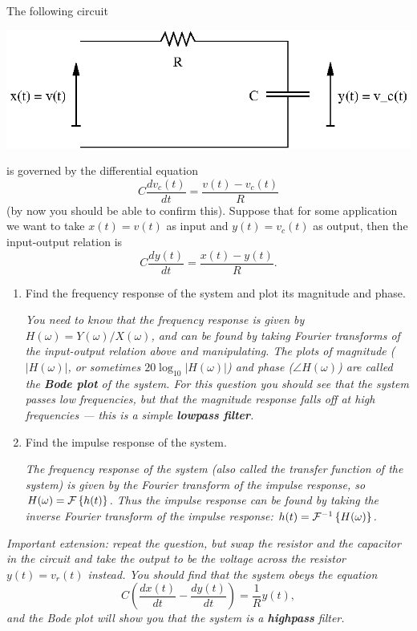 The following circuit
\begin{center}
  \includegraphics{qsystf2_fig1}
\end{center}
is governed by the differential equation
\begin{equation*}
  C \frac{dv_c(t)}{dt} = \frac{v(t) - v_c(t)}{R}
\end{equation*}
(by now you should be able to confirm this).  Suppose that for
some application we want to take $x(t) = v(t)$ as input and
$y(t) = v_c(t)$ as output, then the input-output relation is
\begin{equation*}
  C \frac{dy(t)}{dt} = \frac{x(t) - y(t)}{R}.
\end{equation*}
\begin{enumerate}
\item Find the frequency response of the system and plot its
magnitude and phase. \newline

{\it You need to know that the frequency response is given by
$H(\omega)=Y(\omega)/X(\omega)$, and can be found by taking
Fourier transforms of the input-output relation above and
manipulating. The plots of magnitude ($|H(\omega)|$, or sometimes
$20 \log_{10} |H(\omega)|$) and phase ($\angle H(\omega)$) are
called the {\bf Bode plot} of the system.  For this question you
should see that the system passes low frequencies, but that the
magnitude response falls off at high frequencies --- this is a
simple {\bf lowpass filter}.} \newline

\item Find the impulse response of the system. \newline

{\it The frequency response of the system (also called the
transfer function of the system) is given by the Fourier transform
of the impulse response, so $H(\omega) = {\cal F} \left\{ h(t)
\right\}$.  Thus the impulse response can be found by taking the
inverse Fourier transform of the impulse response:  $h(t) = {\cal
F}^{-1} \left\{ H(\omega) \right\}$.} \newline

\end{enumerate}

{\it Important extension:  repeat the question, but swap the
resistor and the capacitor in the circuit and take the output to
be the voltage across the resistor $y(t) = v_r(t)$ instead.  You
should find that the system obeys the equation
\begin{equation*}
  C \left( \frac{dx(t)}{dt} - \frac{dy(t)}{dt} \right) =
  \frac{1}{R} y(t),
\end{equation*}
and the Bode plot will show you that the system is a {\bf
highpass} filter.}
